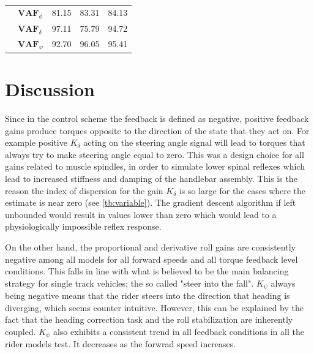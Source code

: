 \begin{table}[]
\begin{tabular}{llcccccc}
                                                   & $\mathbf{VAF}_\phi$                                    & \multicolumn{2}{c}{81.15}                                                                          & \multicolumn{2}{c}{83.31}                                                                          & \multicolumn{2}{c}{84.13}                                                                          \\
                                                   & $\mathbf{VAF}_\delta$                                  & \multicolumn{2}{c}{97.11}                                                                          & \multicolumn{2}{c}{75.79}                                                                          & \multicolumn{2}{c}{94.72}                                                                          \\
                                                   & $\mathbf{VAF}_\psi$                                    & \multicolumn{2}{c}{92.70}                                                                          & \multicolumn{2}{c}{96.05}                                                                          & \multicolumn{2}{c}{95.41}                                                                         
    \end{tabular}
    \end{table}
\section{Discussion}
 
Since in the control scheme the feedback is defined as negative, positive feedback gains produce torques opposite to the direction of the state that they act on. For example   positive \ensuremath{K_\delta} acting on the steering angle signal will lead to torques that always try to make steering angle equal to zero. This was a design choice for all gains related to muscle spindles, in order to simulate lower spinal reflexes which  lead to increased stiffness and damping of the handlebar assembly. This is the reason the index of dispersion for the gain \ensuremath{K_\delta} is so large for the cases where the estimate is near zero (see \cref{tb:variable}). The gradient descent algorithm if left unbounded would result in values lower than zero which would lead to a physiologically impossible reflex response.  

On the other hand, the proportional and derivative roll gains  are consistently negative among all models for all forward speeds and all torque feedback level conditions. This falls in line with what is believed to be the main balancing strategy for single track vehicles; the so called "steer into the fall". \ensuremath{K_\psi} always being negative means that the rider steers into the direction that heading is diverging, which  seems counter intuitive. However, this can be explained by the fact that the heading correction task and the roll stabilization are inherently coupled. \ensuremath{K_\psi} also exhibits a  consistent trend in all feedback conditions in all the rider models test. It decreases as the forwrad speed increases.  

